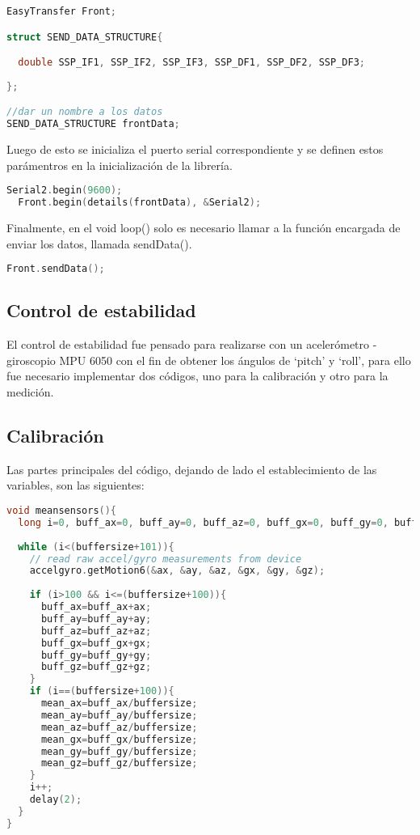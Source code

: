 \documentclass[12pt,letterpaper]{IEEEtran}
\begin{document}
\begin{lstlisting}[language=c++]
EasyTransfer Front;

struct SEND_DATA_STRUCTURE{

  double SSP_IF1, SSP_IF2, SSP_IF3, SSP_DF1, SSP_DF2, SSP_DF3;
  
};

//dar un nombre a los datos
SEND_DATA_STRUCTURE frontData;
\end{lstlisting}

Luego de esto se inicializa el puerto serial correspondiente y se definen estos parámentros en la inicialización de la librería.

\begin{lstlisting}[language=c++]
  Serial2.begin(9600);
  Front.begin(details(frontData), &Serial2);
\end{lstlisting}

Finalmente, en el void loop() solo es necesario llamar a la función encargada de enviar los datos, llamada sendData().

\begin{lstlisting}[language=c++]
  Front.sendData();
\end{lstlisting}

\subsection{Control de estabilidad}

El control de estabilidad fue pensado para realizarse con un acelerómetro - giroscopio MPU 6050 con el fin de obtener los ángulos de `pitch' y `roll', para ello fue necesario implementar dos códigos, uno para la calibración y otro para la medición.

\subsection*{Calibración}

Las partes principales del código, dejando de lado el establecimiento de las variables, son las siguientes:

\begin{lstlisting}[language=c++]
void meansensors(){
  long i=0, buff_ax=0, buff_ay=0, buff_az=0, buff_gx=0, buff_gy=0, buff_gz=0;
 
  while (i<(buffersize+101)){
    // read raw accel/gyro measurements from device
    accelgyro.getMotion6(&ax, &ay, &az, &gx, &gy, &gz);
    
    if (i>100 && i<=(buffersize+100)){ 
      buff_ax=buff_ax+ax;
      buff_ay=buff_ay+ay;
      buff_az=buff_az+az;
      buff_gx=buff_gx+gx;
      buff_gy=buff_gy+gy;
      buff_gz=buff_gz+gz;
    }
    if (i==(buffersize+100)){
      mean_ax=buff_ax/buffersize;
      mean_ay=buff_ay/buffersize;
      mean_az=buff_az/buffersize;
      mean_gx=buff_gx/buffersize;
      mean_gy=buff_gy/buffersize;
      mean_gz=buff_gz/buffersize;
    }
    i++;
    delay(2); 
  }
}
\end{lstlisting}
\end{document}
